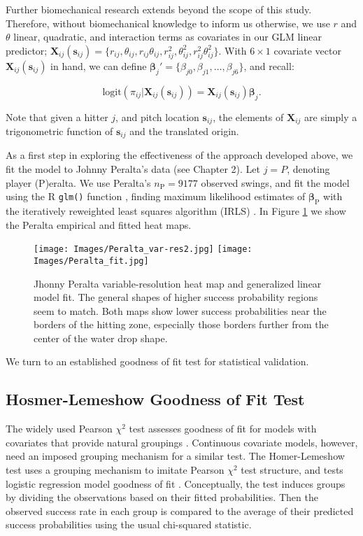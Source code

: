 Further biomechanical research extends beyond the scope of this study. Therefore, without biomechanical knowledge to inform us otherwise, we use $r$ and $\theta$ linear, quadratic, and interaction terms as covariates in our GLM linear predictor; $\pmb{X}_{ij}(\pmb{s}_{ij}) = \{r_{ij}, \theta_{ij}, r_{ij}\theta_{ij}, r_{ij}^{2}, \theta_{ij}^{2}, r_{ij}^{2}\theta_{ij}^{2}\}$. With $6 \times 1$ covariate vector $\pmb{X}_{ij}(\pmb{s}_{ij})$ in hand, we can define $\pmb{\beta}_{j}' =  \{\beta_{j0}, \beta_{j1}, \dots, \beta_{j6}\}$, and recall:

\begin{equation} \label{eq:glm}
\text{logit}(\pi_{ij}|\pmb{X}_{ij}(\pmb{s}_{ij})) = \pmb{X}_{ij}(\pmb{s}_{ij}) \pmb{\beta}_{j}.
\end{equation}

Note that given a hitter $j$, and pitch location $\pmb{s}_{ij}$, the elements of $\pmb{X}_{ij}$ are simply a trigonometric function of $\pmb{s}_{ij}$ and the translated origin.

As a first step in exploring the effectiveness of the approach developed above, we fit the model to Johnny Peralta's data (see Chapter 2). Let $j = P$, denoting player (P)eralta. We use Peralta's $n_{\text{P}} = 9177$ observed swings, and fit the model using the R \verb|glm()| function , finding maximum likelihood estimates of $\pmb{\beta}_{\text{P}}$ with the iteratively reweighted least squares algorithm (IRLS) \citep{Myers2012}. In Figure \ref{fig:empvsfit} we show the Peralta empirical and fitted heat maps.
  \begin{figure}[!ht]
    \centering
    \texttt{[image: Images/Peralta\_var-res2.jpg]}
    \texttt{[image: Images/Peralta\_fit.jpg]}
    \caption{Jhonny Peralta variable-resolution heat map and generalized linear model fit. The general shapes of higher success probability regions seem to match. Both maps show lower success probabilities near the borders of the hitting zone, especially those borders further from the center of the water drop shape.}
    \label{fig:empvsfit}
  \end{figure}
We turn to an established goodness of fit test for statistical validation.

\subsection{Hosmer-Lemeshow Goodness of Fit Test} %

The widely used Pearson $\chi^{2}$ test assesses goodness of fit for models with covariates that provide natural groupings \citep{Pagano2000}. Continuous covariate models, however, need an imposed grouping mechanism for a similar test. The Homer-Lemeshow test uses a grouping mechanism to imitate Pearson $\chi^{2}$ test structure, and tests logistic regression model goodness of fit \citep{Hosmer2013}. Conceptually, the test induces groups by dividing the observations based on their fitted probabilities. Then the observed success rate in each group is compared to the average of their predicted success probabilities using the usual chi-squared statistic.

